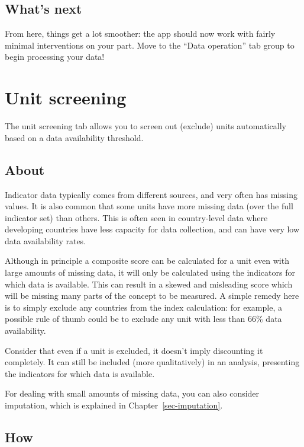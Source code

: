 \documentclass[
  letterpaper,
  DIV=11,
  numbers=noendperiod]{scrreprt}
\begin{document}
\hypertarget{whats-next}{%
\section{What's next}\label{whats-next}}

From here, things get a lot smoother: the app should now work with
fairly minimal interventions on your part. Move to the ``Data
operation'' tab group to begin processing your data!

\hypertarget{sec-screening}{%
\chapter{Unit screening}\label{sec-screening}}

The unit screening tab allows you to screen out (exclude) units
automatically based on a data availability threshold.

\hypertarget{about}{%
\section{About}\label{about}}

Indicator data typically comes from different sources, and very often
has missing values. It is also common that some units have more missing
data (over the full indicator set) than others. This is often seen in
country-level data where developing countries have less capacity for
data collection, and can have very low data availability rates.

Although in principle a composite score can be calculated for a unit
even with large amounts of missing data, it will only be calculated
using the indicators for which data is available. This can result in a
skewed and misleading score which will be missing many parts of the
concept to be measured. A simple remedy here is to simply exclude any
countries from the index calculation: for example, a possible rule of
thumb could be to exclude any unit with less than 66\% data
availability.

Consider that even if a unit is excluded, it doesn't imply discounting
it completely. It can still be included (more qualitatively) in an
analysis, presenting the indicators for which data is available.

For dealing with small amounts of missing data, you can also consider
imputation, which is explained in Chapter~\ref{sec-imputation}.

\hypertarget{how}{%
\section{How}\label{how}}
\end{document}
